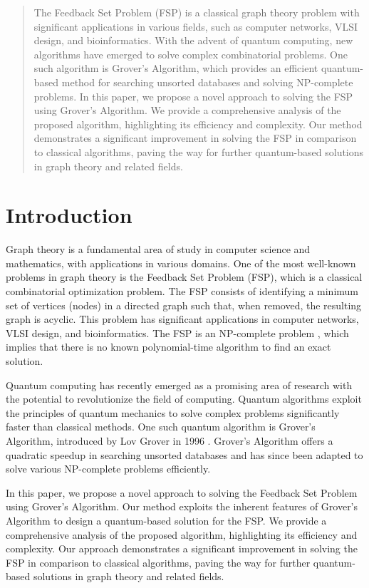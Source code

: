 \begin{abstract}
The Feedback Set Problem (FSP) is a classical graph theory problem with significant applications in various fields, such as computer networks, VLSI design, and bioinformatics. With the advent of quantum computing, new algorithms have emerged to solve complex combinatorial problems. One such algorithm is Grover's Algorithm, which provides an efficient quantum-based method for searching unsorted databases and solving NP-complete problems. In this paper, we propose a novel approach to solving the FSP using Grover's Algorithm. We provide a comprehensive analysis of the proposed algorithm, highlighting its efficiency and complexity. Our method demonstrates a significant improvement in solving the FSP in comparison to classical algorithms, paving the way for further quantum-based solutions in graph theory and related fields. 

\end{abstract}

\section{Introduction}
\label{sec:introduction}

Graph theory is a fundamental area of study in computer science and mathematics, with applications in various domains. One of the most well-known problems in graph theory is the Feedback Set Problem (FSP), which is a classical combinatorial optimization problem. The FSP consists of identifying a minimum set of vertices (nodes) in a directed graph such that, when removed, the resulting graph is acyclic. This problem has significant applications in computer networks, VLSI design, and bioinformatics. The FSP is an NP-complete problem \cite{Karp1972}, which implies that there is no known polynomial-time algorithm to find an exact solution. 

Quantum computing has recently emerged as a promising area of research with the potential to revolutionize the field of computing. Quantum algorithms exploit the principles of quantum mechanics to solve complex problems significantly faster than classical methods. One such quantum algorithm is Grover's Algorithm, introduced by Lov Grover in 1996 \cite{Grover1996}. Grover's Algorithm offers a quadratic speedup in searching unsorted databases and has since been adapted to solve various NP-complete problems efficiently.

In this paper, we propose a novel approach to solving the Feedback Set Problem using Grover's Algorithm. Our method exploits the inherent features of Grover's Algorithm to design a quantum-based solution for the FSP. We provide a comprehensive analysis of the proposed algorithm, highlighting its efficiency and complexity. Our approach demonstrates a significant improvement in solving the FSP in comparison to classical algorithms, paving the way for further quantum-based solutions in graph theory and related fields.

